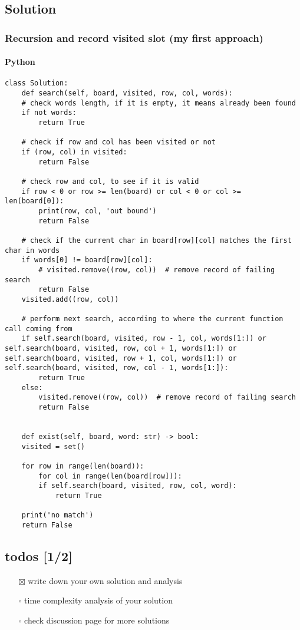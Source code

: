 \documentclass[12pt]{article}
\begin{document}
\subsection{Solution}
\label{sec:orgc297f04}
\subsubsection{Recursion and record visited slot (my first approach)}
\label{sec:org54543ba}
\paragraph{Python}
\label{sec:orga647fdb}
\begin{verbatim}
class Solution:
    def search(self, board, visited, row, col, words):
	# check words length, if it is empty, it means already been found
	if not words:
	    return True

	# check if row and col has been visited or not
	if (row, col) in visited:
	    return False

	# check row and col, to see if it is valid
	if row < 0 or row >= len(board) or col < 0 or col >= len(board[0]):
	    print(row, col, 'out bound')
	    return False

	# check if the current char in board[row][col] matches the first char in words
	if words[0] != board[row][col]:
	    # visited.remove((row, col))  # remove record of failing search
	    return False
	visited.add((row, col))

	# perform next search, according to where the current function call coming from
	if self.search(board, visited, row - 1, col, words[1:]) or self.search(board, visited, row, col + 1, words[1:]) or self.search(board, visited, row + 1, col, words[1:]) or self.search(board, visited, row, col - 1, words[1:]):
	    return True
	else:
	    visited.remove((row, col))  # remove record of failing search
	    return False


    def exist(self, board, word: str) -> bool:
	visited = set()

	for row in range(len(board)):
	    for col in range(len(board[row])):
		if self.search(board, visited, row, col, word):
		    return True

	print('no match')
	return False
\end{verbatim}
\subsection{todos [1/2]}
\label{sec:org081733e}
\begin{itemize}
\item[{$\boxtimes$}] write down your own solution and analysis
\item[{$\square$}] time complexity analysis of your solution
\item[{$\square$}] check discussion page for more solutions
\end{itemize}
\end{document}
